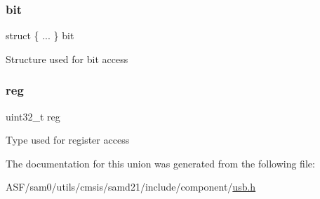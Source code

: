 \subsubsection{\texorpdfstring{bit}{bit}}
{\footnotesize\ttfamily struct \{ ... \}   bit}

Structure used for bit access \mbox{\label{union_u_s_b___d_e_v_i_c_e___a_d_d_r___type_a6b91636401516a477989a336376d7b40}} 
\subsubsection{\texorpdfstring{reg}{reg}}
{\footnotesize\ttfamily uint32\+\_\+t reg}

Type used for register access 

The documentation for this union was generated from the following file\+:\begin{DoxyCompactItemize}
\item 
A\+S\+F/sam0/utils/cmsis/samd21/include/component/\mbox{\hyperlink{component_2usb_8h}{usb.\+h}}\end{DoxyCompactItemize}
